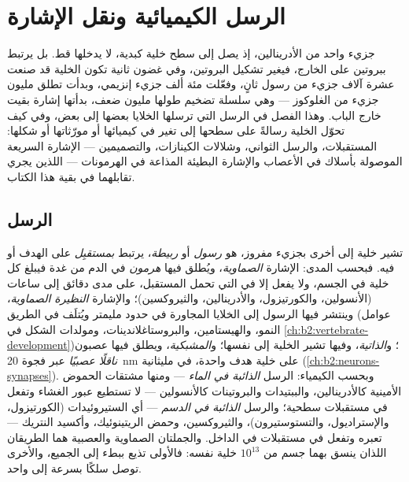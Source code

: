 \chapter{الرسل الكيميائية ونقل الإشارة}\label{ch:b2:cell-signalling}

جزيء واحد من الأدرينالين، إذ يصل إلى سطح خلية
كبدية، لا يدخلها قط. بل يرتبط ببروتين على الخارج، فيغير
تشكيل البروتين، وفي غضون ثانية تكون الخلية قد صنعت عشرة
آلاف جزيء من رسول ثانٍ، وفعّلت مئة
ألف جزيء إنزيمي، وبدأت تطلق مليون جزيء
من الغلوكوز --- وهي سلسلة تضخيم طولها مليون ضعف، بدأتها
إشارة بقيت خارج الباب. وهذا الفصل في
الرسل التي ترسلها الخلايا بعضها إلى بعض، وفي كيف تحوّل الخلية
رسالةً على سطحها إلى تغير في كيميائها أو مورّثاتها أو
شكلها: المستقبلات، والرسل الثواني، وشلالات
الكينازات، والتصميمين --- الإشارة السريعة الموصولة بأسلاك في الأعصاب
والإشارة البطيئة المذاعة في الهرمونات --- اللذين يجري تقابلهما
في بقية هذا الكتاب.

\section{الرسل}

\begin{definition}\label{def:b2:cell-signalling:kinds}
تشير خلية إلى أخرى بجزيء مفروز، هو
\emph{رسول} أو \emph{ربيطة}، يرتبط \emph{بمستقبِل} على
الهدف أو فيه. فبحسب المدى: الإشارة \emph{الصماوية}، ويُطلق فيها
\emph{هرمون} في الدم من غدة فيبلغ
كل خلية في الجسم، ولا يفعل إلا في التي تحمل المستقبل،
على مدى دقائق إلى ساعات (الأنسولين، والكورتيزول، والأدرينالين، والثيروكسين)؛
والإشارة \emph{النظيرة الصماوية}، وينتشر فيها الرسول إلى
الخلايا المجاورة في حدود مليمتر ويُتلَف في الطريق
(عوامل النمو، والهيستامين، والبروستاغلاندينات، ومولدات الشكل في
\cref{ch:b2:vertebrate-development})؛ و\emph{الذاتية}، وفيها تشير الخلية
إلى نفسها؛ و\emph{المشبكية}، ويطلق فيها عصبون
\emph{ناقلًا عصبيًا} عبر فجوة \qty{20}{nm} على
خلية هدف واحدة، في مليثانية (\cref{ch:b2:neurons-synapses}).
وبحسب الكيمياء: الرسل \emph{الذائبة في الماء} --- ومنها مشتقات
الحموض الأمينية كالأدرينالين، والببتيدات والبروتينات كالأنسولين ---
لا تستطيع عبور الغشاء وتفعل في مستقبلات سطحية؛
والرسل \emph{الذائبة في الدسم} --- أي الستيروئيدات (الكورتيزول،
والإستراديول، والتستوستيرون)، والثيروكسين، وحمض الريتينوئيك، وأكسيد النتريك ---
تعبره وتفعل في مستقبلات في الداخل. والجملتان الصماوية والعصبية
هما الطريقان اللذان ينسق بهما جسم من $10^{13}$ خلية
نفسه: فالأولى تذيع ببطء إلى الجميع، والأخرى توصل سلكًا
بسرعة إلى واحد.
\end{definition}

